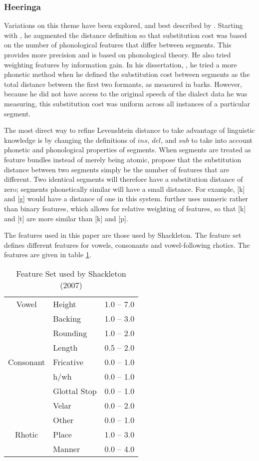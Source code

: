 \documentclass[11pt]{article}
\begin{document}
\subsubsection{Heeringa}
\label{levmethod}
Variations on this theme have been explored, and best described by
. Starting with \cite{nerbonne97}, he augmented
the distance definition so that substitution cost was based on the
number of phonological features that differ between segments. This provides more
precision and is based on phonological theory. He also tried
weighting features by information gain.  In his dissertation,
\cite{heeringa04}, he tried a more phonetic method when he defined the
substitution cost between segments as the total distance between the
first two formants, as measured in barks. However, because he did not
have access to the original speech of the dialect data he was
measuring, this substitution cost was uniform across all instances of
a particular segment.

The most direct way to refine Levenshtein distance to take advantage
of linguistic knowledge is by changing the definitions of $ins$,
$del$, and $sub$ to take into account phonetic and phonological
properties of segments. When segments are treated as feature bundles
instead of merely being atomic,  propose that the
substitution distance between two segments simply be the number of
features that are different. Two identical segments will therefore
have a substitution distance of zero; segments phonetically similar
will have a small distance. For example, [k] and [g] would have a
distance of one in this system.  further uses
numeric rather than binary features, which allows for relative
weighting of features, so that [k] and [t] are more similar than [k]
and [p].

The features used in this paper are those used by Shackleton. The
feature set defines different features for vowels, consonants and
vowel-following rhotics. The features are given in table
\ref{featureset}.

\begin{table}
\begin{tabular}{c|lr}
Vowel & Height & 1.0 -- 7.0 \\
  & Backing & 1.0 -- 3.0 \\
  & Rounding & 1.0 -- 2.0 \\
  & Length & 0.5 -- 2.0 \\ \hline
Consonant & Fricative & 0.0 -- 1.0 \\
  & h/wh & 0.0 -- 1.0 \\
  & Glottal  Stop &0.0 -- 1.0 \\
  & Velar & 0.0 -- 2.0 \\
  & Other & 0.0 -- 1.0 \\ \hline
Rhotic & Place & 1.0 -- 3.0 \\
  & Manner & 0.0 -- 4.0 \\
\end{tabular}
\caption{Feature Set used by Shackleton (2007)}
\label{featureset}
\end{table}
\end{document}
